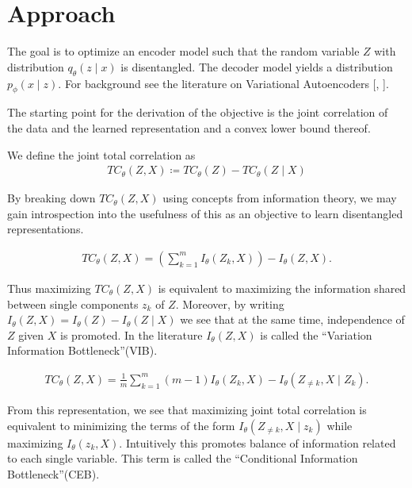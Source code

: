 \documentclass[twoside,11pt]{article}
\begin{document}
\section{Approach}
The goal is to optimize an encoder model such that the random variable $Z$ with distribution $q_{\theta}(z \mid x)$ is disentangled. The decoder model yields a distribution $p_{\phi}(x \mid z)$. For background see the literature on Variational Autoencoders [\cite{VAE_foundational}, \cite{VAE_explained}].

The starting point for the derivation of the objective is the joint correlation of the data and the learned representation and a convex lower bound thereof.
\begin{definition}
  We define the joint total correlation as
  \begin{align*}
    TC_{\theta}(Z, X) \coloneqq TC_{\theta}(Z) - TC_{\theta}(Z \mid X)
  \end{align*}
\end{definition}
By breaking down $TC_{\theta}(Z, X)$ using concepts from information theory, we may gain introspection into the usefulness of this as an objective to learn disentangled representations.


\begin{proposition}
  \begin{align*}
    TC_{\theta}(Z, X) = (\sum_{k=1}^{m}I_{\theta}(Z_{k}, X)) - I_{\theta}(Z,X).
  \end{align*}
\end{proposition}
Thus maximizing $TC_{\theta}(Z,X)$ is equivalent to maximizing the information shared between single components $z_{k}$ of $Z$.
Moreover, by writing $I_{\theta}(Z,X) = I_{\theta}(Z) - I_{\theta}(Z \mid X)$ we see that at the same time, independence of $Z$ given $X$ is promoted.
In the literature $I_{\theta}(Z,X)$ is called the \enquote{Variation Information Bottleneck}(VIB).

\begin{proposition}
  \begin{align*}
    TC_{\theta}(Z, X) = \frac{1}{m}\sum_{k=1}^{m}(m-1)I_{\theta}(Z_{k}, X) - I_{\theta}(Z_{\neq k}, X \mid Z_{k}).
  \end{align*}
\end{proposition}
From this representation, we see that maximizing joint total correlation is equivalent to minimizing the terms of the form $I_{\theta}(Z_{\neq k}, X \mid z_{k})$ while maximizing $I_{\theta}(z_{k}, X)$.
Intuitively this promotes balance of information related to each single variable. This term is called the \enquote{Conditional Information Bottleneck}(CEB).
\end{document}

